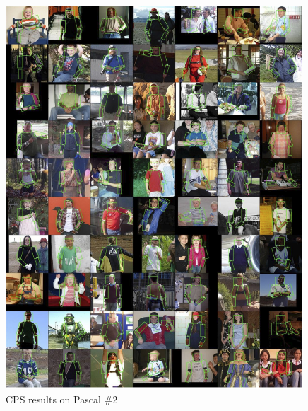 \begin{figure}[tb]
\begin{center}
\includegraphics[width=0.99\textwidth]{figs/pascal-cps-2.jpg}
\caption[CPS results on Pascal \#2]{CPS results on Pascal \#2}
\label{fig:pascal-cps2}
\end{center}
\end{figure}

